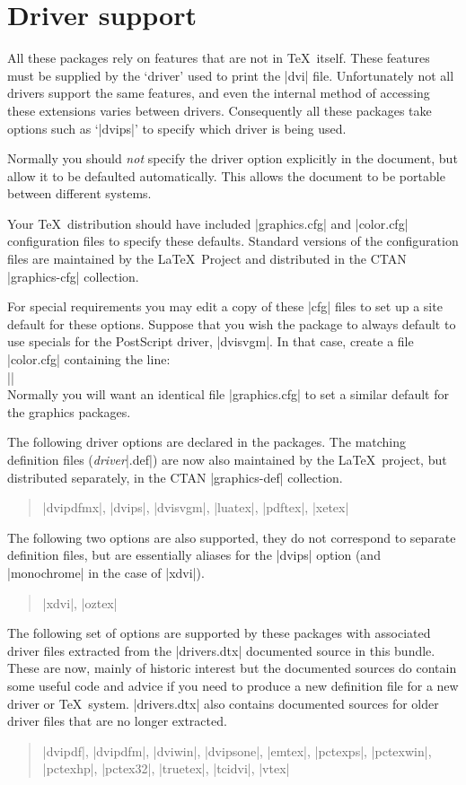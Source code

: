 \section{Driver support}\label{drivers}
All these packages rely on features that are not in \TeX\ itself.
These features must be supplied by the `driver' used to print the
|dvi| file. Unfortunately not all drivers support the same features, and
even the internal method of accessing these extensions varies between
drivers. Consequently all these packages take options such as
`|dvips|' to specify which driver is being used.

Normally you should \emph{not} specify the driver option explicitly
in the document, but allow it to be defaulted automatically.
This allows the document to be portable between different systems.

Your \TeX\ distribution should have included |graphics.cfg| and
|color.cfg| configuration files to specify these defaults.
Standard versions of the configuration files are maintained by the
\LaTeX\ Project and distributed in the CTAN |graphics-cfg| collection.

For special requirements you may edit a copy of these |cfg| files
to set up a site default for these options. Suppose that you wish
the  package to always default to use specials for the
PostScript driver, |dvisvgm|. In that case, create a file |color.cfg|
containing the line:\\
||\\
Normally you will want an identical file |graphics.cfg| to set a similar
default for the graphics packages.

The following driver options are declared in the packages.
The matching definition files (\emph{driver}|.def|)
are now also maintained by the \LaTeX\ project,
but distributed separately, in the CTAN |graphics-def| collection.
\begin{quote}\raggedright
  |dvipdfmx|, |dvips|, |dvisvgm|, |luatex|, |pdftex|, |xetex|
\end{quote}


The following two options are also supported, they do not correspond
to separate definition files, but are essentially aliases for the
|dvips| option (and |monochrome| in the case of |xdvi|).
\begin{quote}\raggedright
 |xdvi|,  |oztex|
\end{quote}

The following set of options are supported by these packages
with associated driver files extracted from the |drivers.dtx|
documented source in this bundle. These are now, mainly of historic
interest but the documented sources do contain some useful code
and advice if you need to produce a new definition file for a new
driver or \TeX\ system. |drivers.dtx| also contains documented
sources for older driver files that are no longer extracted.
\begin{quote}\raggedright
 |dvipdf|, |dvipdfm|, |dviwin|, |dvipsone|,
 |emtex|, |pctexps|, |pctexwin|,  |pctexhp|, |pctex32|,
 |truetex|, |tcidvi|, |vtex|
\end{quote}

